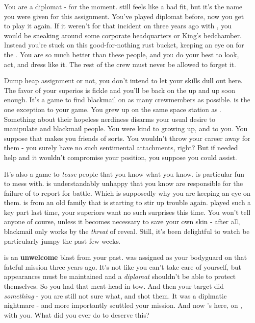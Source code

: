 \documentclass[char]{TMFHope}
\begin{document}
\name{\cDip{}}

You are a diplomat - for the moment. \cDip{} still feels like a bad fit, but it's the name you were given for this assignment. You've played diplomat before, now you get to play it again. If it weren't for that incident on \pHome{} three years ago with \cWeap{}, you would be sneaking around some corporate headquarters or King's bedchamber. Instead you're stuck on this good-for-nothing rust bucket, keeping an eye on \cXO{} for the \pPlan{}. You are so much better than these people, and you do your best to look, act, and dress like it. The rest of the crew must never be allowed to forget it.

Dump heap assignment or not, you don't intend to let your skills dull out here. The favor of your superios is fickle and you'll be back on the up and up soon enough. It's a game to find blackmail on as many crewmembers as possible. \cMed{} is the one exception to your game. You grew up on the same space station as \cMed{\them}. Something about their hopeless nerdiness disarms your usual desire to manipulate and blackmail people. You were kind to \cMed{\them} growing up, and \cMed{\they} to you. You suppose that makes you friends of sorts. You wouldn't throw your career away for them - you surely have no such sentimental attachments, right? But if \cMed{} needed help and it wouldn't compromise your position, you suppose you could assist.

It's also a game to \emph{tease} people that you know what you know. \cXO{} is particular fun to mess with. \cXO{\They} is understandably unhappy that you know \cXO{\they} are responsible for the failure of \pOld{} to report for battle. Which is supposedly why you are keeping an eye on them. \cXO{} is from an old \pEdge{} family that is starting to stir up trouble again. \cXO{\They} played such a key part last time, your superiors want no such surprises this time. You won't tell anyone of course, unless it becomes necessary to save your own skin - after all, blackmail only works by the \emph{threat} of reveal. Still, it's been delightful to watch \cXO{} be particularly jumpy the past few weeks. 

\cWeap{} is an {\bf unwelcome} blast from your past. \cWeap{} was assigned as your bodyguard on that fateful mission three years ago. It's not like you can't take care of yourself, but appearances must be maintained and a \emph{diplomat} shouldn't be able to protect themselves. So you had that meat-head in tow. And then your target did \emph{something} - you are still not sure what, and \cWeap{} shot them. It was a diplmatic nightmare - and more importantly scuttled your mission. And now \cWeap{\they}'s here, on \pNew{}, with you. What did you ever do to deserve this?
\end{document}
